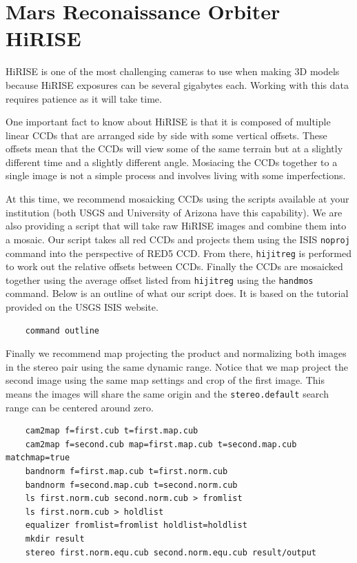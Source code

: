 \section{Mars Reconaissance Orbiter HiRISE}

HiRISE is one of the most challenging cameras to use when making 3D
models because HiRISE exposures can be several gigabytes each. Working
with this data requires patience as it will take time.

One important fact to know about HiRISE is that it is composed of
multiple linear CCDs that are arranged side by side with some vertical
offsets. These offsets mean that the CCDs will view some of the same
terrain but at a slightly different time and a slightly different
angle. Mosiacing the CCDs together to a single image is not a simple
process and involves living with some imperfections.

At this time, we recommend mosaicking CCDs using the scripts available
at your institution (both USGS and University of Arizona have this
capability).  We are also providing a script that will take raw HiRISE
images and combine them into a mosaic. Our script takes all red CCDs
and projects them using the ISIS {\tt noproj} command into the
perspective of RED5 CCD. From there, {\tt hijitreg} is performed to
work out the relative offsets between CCDs. Finally the CCDs are
mosaicked together using the average offset listed from {\tt hijitreg}
using the {\tt handmos} command. Below is an outline of what our
script does.  It is based on the tutorial provided on the USGS ISIS
website.

\begin{verbatim}
    command outline
\end{verbatim}

Finally we recommend map projecting the product and normalizing both
images in the stereo pair using the same dynamic range. Notice that we
map project the second image using the same map settings and crop of
the first image. This means the images will share the same origin and
the {\tt stereo.default} search range can be centered around zero.

\begin{verbatim}
    cam2map f=first.cub t=first.map.cub
    cam2map f=second.cub map=first.map.cub t=second.map.cub matchmap=true
    bandnorm f=first.map.cub t=first.norm.cub
    bandnorm f=second.map.cub t=second.norm.cub
    ls first.norm.cub second.norm.cub > fromlist
    ls first.norm.cub > holdlist
    equalizer fromlist=fromlist holdlist=holdlist
    mkdir result
    stereo first.norm.equ.cub second.norm.equ.cub result/output
\end{verbatim}

